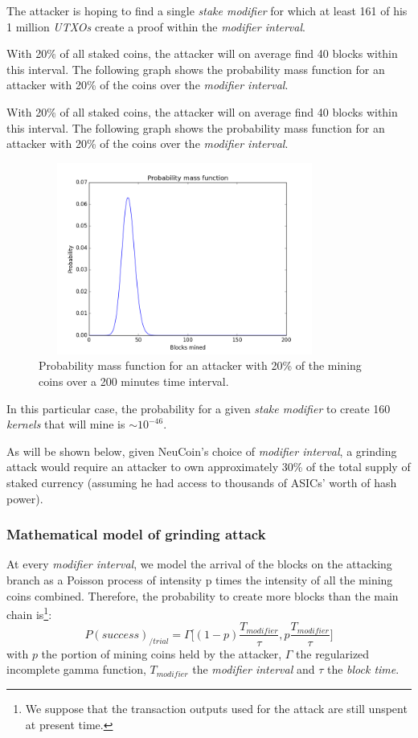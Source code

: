 \documentclass[a4paper,11pt]{article}
\begin{document}
The attacker is hoping to find a single \textit{stake modifier} for which at least 161 of his 1 million \textit{UTXOs} create a proof within the \textit{modifier interval}.

With 20\% of all staked coins, the attacker will on average find 40 blocks within this interval. The following graph shows the probability mass function for an attacker with 20\% of the coins over the \textit{modifier interval}.

With 20\% of all staked coins, the attacker will on average find 40 blocks within this interval. The following graph shows the probability mass function for an attacker with 20\% of the coins over the \textit{modifier interval}.


\begin{figure}[H]
\centering
\includegraphics[width=96mm,height=63mm]{06_gaussian_20perc.png}
\caption{Probability mass function for an attacker with 20\% of the mining coins over a 200 minutes time interval.}
\end{figure}

In this particular case, the probability for a given \textit{stake modifier} to create 160 \textit{kernels} that will mine is $\sim10^{-46}$. 

As will be shown below, given NeuCoin's choice of \textit{modifier interval}, a grinding attack would require an attacker to own approximately 30\% of the total supply of staked currency (assuming he had access to thousands of ASICs' worth of hash power).

\subsubsection*{Mathematical model of grinding attack}

At every \textit{modifier interval}, we model the arrival of the blocks on the attacking branch as a Poisson process of intensity p times the intensity of all the mining coins combined. Therefore, the probability to create more blocks than the main chain is\footnote{We suppose that the transaction outputs used for the attack are still unspent at present time.}:
$$P(success)_{/trial}=\Gamma\Big[(1-p)\frac{T_{modifier}}{\tau},p\frac{T_{modifier}}{\tau}\Big]$$
with $p$ the portion of mining coins held by the attacker, $\Gamma$ the regularized incomplete gamma function, $T_{modifier}$ the \textit{modifier interval} and $\tau$ the \textit{block time}.
\end{document}
